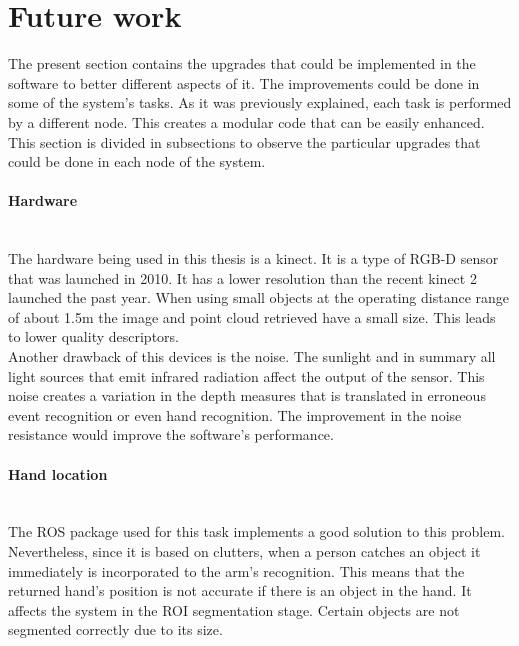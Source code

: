 	\section{Future work}

	The present section contains the upgrades that could be implemented in the software to better different aspects of it. 
	The improvements could be done in some of the system's tasks.
	As it was previously explained, each task is performed by a different node. 
	This creates a modular code that can be easily enhanced. 
	\\

	This section is divided in subsections to observe the particular upgrades that could be done in each node of the system. 

	\paragraph{Hardware}\mbox{}\\

	The hardware being used in this thesis is a kinect. 
	It is a type of RGB-D sensor that was launched in 2010. 
	It has a lower resolution than the recent kinect 2 launched the past year. 
	When using small objects at the operating distance range of about 1.5m the image and point cloud retrieved have a small size. 
	This leads to lower quality descriptors.
	\\

	Another drawback of this devices is the noise. 
	The sunlight and in summary all light sources that emit infrared radiation affect the output of the sensor. 
	This noise creates a variation in the depth measures that is translated in erroneous event recognition or even hand recognition. 
	The improvement in the noise resistance would improve the software's performance. 


	\paragraph{Hand location}\mbox{}\\

	The ROS package used for this task implements a good solution to this problem. 
	Nevertheless, since it is based on clutters, when a person catches an object it immediately is incorporated to the arm's recognition. 
	This means that the returned hand's position is not accurate if there is an object in the hand. 
	It affects the system in the ROI segmentation stage. 
	Certain objects are not segmented correctly due to its size.  
	\\

